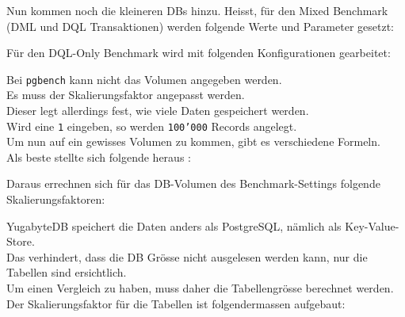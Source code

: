 \recalctypearea
\begin{flushleft}
    Nun kommen noch die kleineren DBs hinzu.
    Heisst, für den Mixed Benchmark (DML und DQL \Gls{Transaktion}en) werden folgende Werte und Parameter gesetzt:
    
\end{flushleft}
\begin{flushleft}
    Für den DQL-Only Benchmark wird mit folgenden Konfigurationen gearbeitet:
    
\end{flushleft}
\clearpage
{}
\recalctypearea
\begin{flushleft}
    Bei \texttt{pgbench} kann nicht das Volumen angegeben werden.\\
    Es muss der Skalierungsfaktor angepasst werden.\\
    Dieser legt allerdings fest, wie viele Daten gespeichert werden.\\
    Wird eine \texttt{1} eingeben, so werden \texttt{100'000} Records angelegt.\\

    Um nun auf ein gewisses Volumen zu kommen, gibt es verschiedene Formeln.\\
    Als beste stellte sich folgende heraus \cite{DKXU3QRC}:\\
    
\end{flushleft}
\begin{flushleft}
    Daraus errechnen sich für das DB-Volumen des Benchmark-Settings folgende Skalierungsfaktoren:\\
    
\end{flushleft}
\begin{flushleft}
    YugabyteDB speichert die Daten anders als PostgreSQL, nämlich als \Gls{Key-Value-Store}.\\
    Das verhindert, dass die DB Grösse nicht ausgelesen werden kann, nur die Tabellen sind ersichtlich.\\
    Um einen Vergleich zu haben, muss daher die Tabellengrösse berechnet werden.\\
    Der Skalierungsfaktor für die Tabellen ist folgendermassen aufgebaut:\\
    
\end{flushleft}
\clearpage

